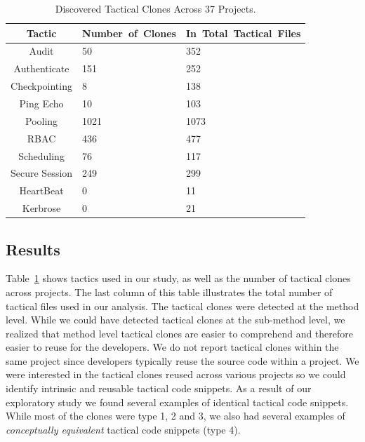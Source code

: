 \begin{table}[tbph]
\vspace{-10pt}
\caption{Discovered Tactical Clones Across 37 Projects.}
\label{tab:ChosenProjects}
\centering

  \begin{tabular}{ c | l | l }
\hline

\bfseries Tactic & \bfseries Number~of~Clones & \bfseries In~Total~Tactical~Files \\ \hline \hline
Audit & 50    & 352 \\ \hline
Authenticate & 151   & 252 \\\hline
Checkpointing & 8     & 138 \\ \hline
Ping Echo & 10    & 103 \\ \hline
Pooling & 1021  & 1073 \\ \hline
RBAC  & 436   & 477 \\ \hline
Scheduling & 76    & 117 \\ \hline
Secure Session & 249   & 299 \\ \hline
HeartBeat & 0     & 11 \\ \hline
Kerbrose & 0     & 21 \\
\end{tabular}%
\vspace{-10pt}
\end{table}

\subsection{Results}
Table~\ref{tab:ChosenProjects} shows tactics used in our study, as well as the number of tactical clones across projects. The last column of this table illustrates the total number of tactical files used in our analysis. The tactical clones were detected at the method level. While we could have detected tactical clones at the sub-method level, we realized that method level tactical clones are easier to comprehend and therefore easier to reuse for the developers. We do not report tactical clones within the same project since developers typically reuse the source code within a project. We were interested in the tactical clones reused across various projects so we could identify intrinsic and reusable tactical code snippets. As a result of our exploratory study we found several examples of identical tactical code snippets. While most of the clones were type 1, 2 and 3, we also had several examples of \textit{conceptually equivalent} tactical code snippets (type 4).

